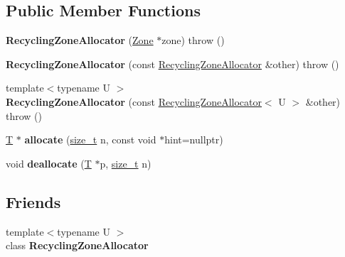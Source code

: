 \subsection*{Public Member Functions}
\begin{DoxyCompactItemize}
\item 
\mbox{\label{classv8_1_1internal_1_1RecyclingZoneAllocator_a772ca08dd105086e38a45c5821ad09d2}} 
{\bfseries Recycling\+Zone\+Allocator} (\mbox{\hyperlink{classv8_1_1internal_1_1Zone}{Zone}} $\ast$zone)  throw ()
\item 
\mbox{\label{classv8_1_1internal_1_1RecyclingZoneAllocator_a988df66d537c0c4f840fec004d7d852c}} 
{\bfseries Recycling\+Zone\+Allocator} (const \mbox{\hyperlink{classv8_1_1internal_1_1RecyclingZoneAllocator}{Recycling\+Zone\+Allocator}} \&other)  throw ()
\item 
\mbox{\label{classv8_1_1internal_1_1RecyclingZoneAllocator_a945dcf86d2ed21469f4ba35e3eb4ac63}} 
{\footnotesize template$<$typename U $>$ }\\{\bfseries Recycling\+Zone\+Allocator} (const \mbox{\hyperlink{classv8_1_1internal_1_1RecyclingZoneAllocator}{Recycling\+Zone\+Allocator}}$<$ U $>$ \&other)  throw ()
\item 
\mbox{\label{classv8_1_1internal_1_1RecyclingZoneAllocator_a6b983f2f6665a01c60498d3f9d45362f}} 
\mbox{\hyperlink{classv8_1_1internal_1_1torque_1_1T}{T}} $\ast$ {\bfseries allocate} (\mbox{\hyperlink{classsize__t}{size\+\_\+t}} n, const void $\ast$hint=nullptr)
\item 
\mbox{\label{classv8_1_1internal_1_1RecyclingZoneAllocator_aa9bbfd5a5434554b7a8af2999e513446}} 
void {\bfseries deallocate} (\mbox{\hyperlink{classv8_1_1internal_1_1torque_1_1T}{T}} $\ast$p, \mbox{\hyperlink{classsize__t}{size\+\_\+t}} n)
\end{DoxyCompactItemize}
\subsection*{Friends}
\begin{DoxyCompactItemize}
\item 
\mbox{\label{classv8_1_1internal_1_1RecyclingZoneAllocator_a9da9c6871db0e59893926e1a012e58f9}} 
{\footnotesize template$<$typename U $>$ }\\class {\bfseries Recycling\+Zone\+Allocator}
\end{DoxyCompactItemize}
